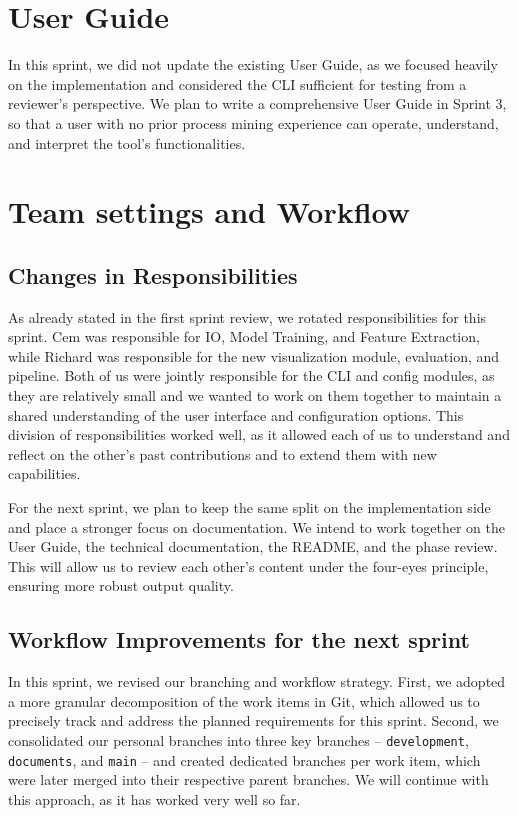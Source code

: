 \documentclass[12pt,a4paper]{article}
\begin{document}
\section{User Guide}
In this sprint, we did not update the existing User Guide, as we focused heavily on the implementation and considered the CLI sufficient for testing from a reviewer's perspective. We plan to write a comprehensive User Guide in Sprint 3, so that a user with no prior process mining experience can operate, understand, and interpret the tool's functionalities.

\section{Team settings and Workflow}
\subsection{Changes in Responsibilities}
As already stated in the first sprint review, we rotated responsibilities for this sprint. Cem was responsible for IO, Model Training, and Feature Extraction, while Richard was responsible for the new visualization module, evaluation, and pipeline. Both of us were jointly responsible for the CLI and config modules, as they are relatively small and we wanted to work on them together to maintain a shared understanding of the user interface and configuration options. This division of responsibilities worked well, as it allowed each of us to understand and reflect on the other's past contributions and to extend them with new capabilities.

For the next sprint, we plan to keep the same split on the implementation side and place a stronger focus on documentation. We intend to work together on the User Guide, the technical documentation, the README, and the phase review. This will allow us to review each other's content under the four-eyes principle, ensuring more robust output quality.

\subsection{Workflow Improvements for the next sprint}
In this sprint, we revised our branching and workflow strategy. First, we adopted a more granular decomposition of the work items in Git, which allowed us to precisely track and address the planned requirements for this sprint. Second, we consolidated our personal branches into three key branches -- \texttt{development}, \texttt{documents}, and \texttt{main} -- and created dedicated branches per work item, which were later merged into their respective parent branches. We will continue with this approach, as it has worked very well so far.
\end{document}
